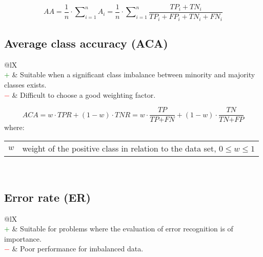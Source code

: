 \documentclass{article}
\makeatletter
\newenvironment{conditions}[1][where:]
    {\hspace{0.02\textwidth} #1 \begin{tabular}[t]{>{$}l<{$} @{${}={}$} l}}
    {\end{tabular}\\[\belowdisplayskip]}
\makeatother
\begin{document}
\begin{equation}
    \textit{AA} = \dfrac{1}{n} \cdot \sum\nolimits_{i = 1}^n A_i = \dfrac{1}{n} \cdot \sum\nolimits_{i = 1}^n \dfrac{\textit{TP}_i + \textit{TN}_i}{\textit{TP}_i + \textit{FP}_i + \textit{TN}_i + \textit{FN}_i}
%
    \label{equation:AA}
\end{equation}


\subsection[Average class accuracy (ACA)]{Average class accuracy (ACA) \cite{bhowan2011developing, devarriya2020unbalanced}}

\begin{table}[H]\centering
    \begin{tabularx}{\textwidth}{@{}lX}
         \\
        \textcolor{Green}{$+$} & Suitable when a significant class imbalance between minority and majority classes exists. \\
        \textcolor{Red}{$-$}   & Difficult to choose a good weighting factor.
    \end{tabularx}
\end{table}

\begin{equation}
    \textit{ACA} = w \cdot \textit{TPR} + (1 - w) \cdot \textit{TNR} = w \cdot \dfrac{\textit{TP}}{\textit{TP} + \textit{FN}} + (1 - w) \cdot \dfrac{\textit{TN}}{\textit{TN} + \textit{FP}}
%
    \label{equation:ACA}
\end{equation}
%
\begin{conditions}
    w & weight of the positive class in relation to the data set, $0 \le w \le 1$
\end{conditions}


\subsection[Error rate (ER)]{Error rate (ER) \cite{hand1986recent, asri2016using}}

\begin{table}[H]\centering
    \begin{tabularx}{\textwidth}{@{}lX}
         \\
        \textcolor{Green}{$+$} & Suitable for problems where the evaluation of error recognition is of importance. \\
        \textcolor{Red}{$-$}   & Poor performance for imbalanced data.
    \end{tabularx}
\end{table}
\end{document}
